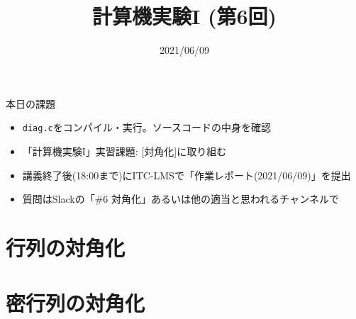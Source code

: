 \documentclass[10pt,dvipdfmx]{beamer}
\title{計算機実験I (第6回)}
\date{2021/06/09}
\begin{document}
\begin{frame}
  \titlepage
  \tableofcontents
\end{frame}

\begin{frame}[t]{本日の課題}
  \begin{itemize}
  \item {\tt diag.c}をコンパイル・実行。ソースコードの中身を確認 \\
  \item 「計算機実験I」実習課題: [対角化]に取り組む
  \item 講義終了後(18:00まで)にITC-LMSで「作業レポート(2021/06/09)」を提出
  \item 質問はSlackの「\#6 対角化」あるいは他の適当と思われるチャンネルで
  \end{itemize}
\end{frame}

\section{行列の対角化}


%






\section{密行列の対角化}










\end{document}
